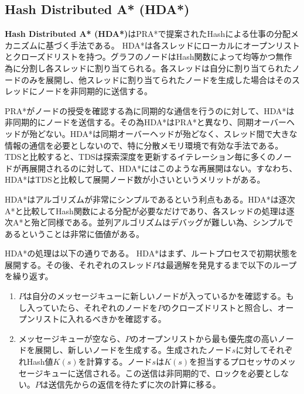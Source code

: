 \documentclass[uplatex]{jsarticle}
\begin{document}
\subsection{Hash Distributed A* (HDA*)}
\textbf{Hash Distributed A* (HDA*)}はPRA*で提案されたHashによる仕事の分配メカニズムに基づく手法である。
HDA*は各スレッドにローカルにオープンリストとクローズドリストを持つ。グラフのノードはHash関数によって均等かつ無作為に分割し各スレッドに割り当てられる。各スレッドは自分に割り当てられたノードのみを展開し、他スレッドに割り当てられたノードを生成した場合はそのスレッドにノードを非同期的に送信する。

PRA*がノードの授受を確認する為に同期的な通信を行うのに対して、HDA*は非同期的にノードを送信する。その為HDA*はPRA*と異なり、同期オーバーヘッドが殆どない。HDA*は同期オーバーヘッドが殆どなく、スレッド間で大きな情報の通信を必要としないので、特に分散メモリ環境で有効な手法である。
TDSと比較すると、TDSは探索深度を更新するイテレーション毎に多くのノードが再展開されるのに対して、HDA*にはこのような再展開はない。すなわち、HDA*はTDSと比較して展開ノード数が小さいというメリットがある。

HDA*はアルゴリズムが非常にシンプルであるという利点もある。HDA*は逐次A*と比較してHash関数による分配が必要なだけであり、各スレッドの処理は逐次A*と殆ど同様である。並列アルゴリズムはデバッグが難しい為、シンプルであるということは非常に価値がある。
\newline



HDA*の処理は以下の通りである。
HDA*はまず、ルートプロセスで初期状態を展開する。その後、それぞれのスレッド$P$は最適解を発見するまで以下のループを繰り返す。

\begin{enumerate}
	\item $P$は自分のメッセージキューに新しいノードが入っているかを確認する。もし入っていたら、それぞれのノードを$P$のクローズドリストと照合し、オープンリストに入れるべきかを確認する。
	\item メッセージキューが空なら、$P$のオープンリストから最も優先度の高いノードを展開し、新しいノードを生成する。生成されたノード$s$に対してそれぞれHash値$K(s)$を計算する。ノード$s$は$K(s)$を担当するプロセッサのメッセージキューに送信される。この送信は非同期的で、ロックを必要としない。$P$は送信先からの返信を待たずに次の計算に移る。
\end{enumerate}
\end{document}
